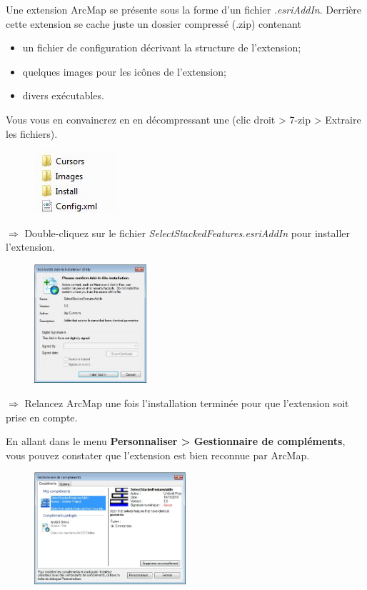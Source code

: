 \documentclass[11pt]{article}
\newcommand{\action}{$\Rightarrow$ }
\begin{document}
Une extension ArcMap se présente sous la forme d'un fichier \textit{.esriAddIn}. Derrière cette extension se cache juste un dossier compressé (.zip) contenant 
\begin{itemize}
\item un fichier de configuration décrivant la structure de l'extension;
\item quelques images pour les icônes de l'extension;
\item divers exécutables.
\end{itemize}
Vous vous en convaincrez en en décompressant une (clic droit > 7-zip > Extraire les fichiers).
\begin{figure}[H]
	\center \includegraphics{img/td1/contenu_addin.jpg} \\
\end{figure}

\action Double-cliquez sur le fichier \textit{SelectStackedFeatures.esriAddIn} pour installer l'extension. 
\begin{figure}[H]
	\center \includegraphics[width=0.37\textwidth]{img/td1/install_addin.jpg} \\
\end{figure}

\action Relancez ArcMap une fois l'installation terminée pour que l'extension soit prise en compte.

En allant dans le menu \textbf{Personnaliser > Gestionnaire de compléments}, vous pouvez constater que l'extension est bien reconnue par ArcMap.
\begin{figure}[H]
	\center \includegraphics[width=0.5\textwidth]{img/td1/am_gestionnaire_complements.jpg} \\
\end{figure}
\end{document}
